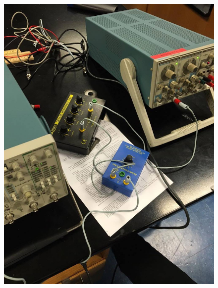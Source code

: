 \documentclass[11pt, titlepage]{article}
\begin{document}
\begin{figure}[h]
\centering
\hspace*{0cm}
\includegraphics[scale=0.6]{lab51.jpg}
\vspace*{0cm}
\end{figure}
\end{document}
